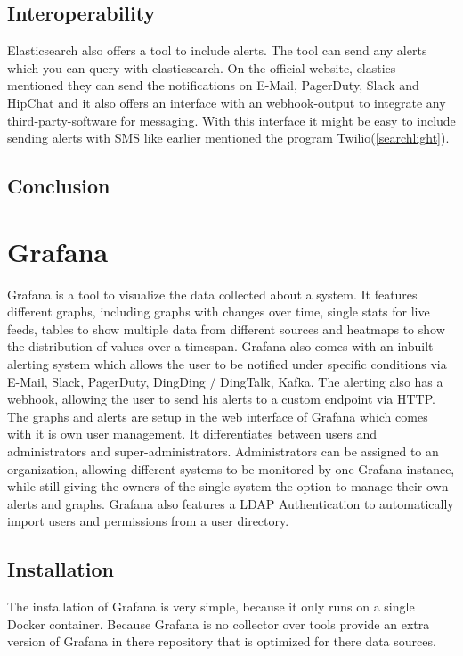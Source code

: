 \subsection{Interoperability}
Elasticsearch also offers a tool to include alerts. The tool can send any alerts which you can query with elasticsearch. On the official website, elastics mentioned they can send the notifications on E-Mail, PagerDuty, Slack and HipChat and it also offers an interface with an webhook-output to integrate any third-party-software for messaging. With this interface it might be easy to include sending alerts with SMS like earlier mentioned the program Twilio(\ref{searchlight}).
\subsection{Conclusion}


\section{Grafana}
\label{grafana} %
Grafana is a tool to visualize the data collected about a system. It features different graphs, including graphs with changes over time, single stats for live feeds, tables to show multiple data from different sources and heatmaps to show the distribution of values over a timespan.
Grafana also comes with an inbuilt alerting system which allows the user to be notified under specific conditions via E-Mail, Slack, PagerDuty, DingDing / DingTalk, Kafka. The alerting also has a webhook, allowing the user to send his alerts to a custom endpoint via HTTP.
The graphs and alerts are setup in the web interface of Grafana which comes with it is own user management. It differentiates between users and administrators and super-administrators. Administrators can be assigned to an organization, allowing different systems to be monitored by one Grafana instance, while still giving the owners of the single system the option to manage their own alerts and graphs.
Grafana also features a LDAP Authentication to automatically import users and permissions from a user directory.
\subsection{Installation}
The installation of Grafana is very simple, because it only runs on a single Docker container. Because Grafana is no collector over tools provide an extra version of Grafana in there repository that is optimized for there data sources.
